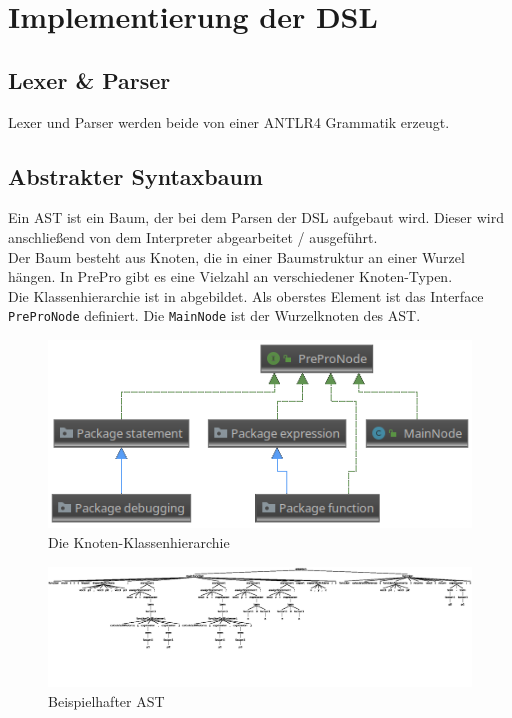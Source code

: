 
\chapter{Implementierung der DSL}

\section{Lexer \& Parser}
Lexer und Parser werden beide von einer ANTLR4 Grammatik erzeugt.

\section{Abstrakter Syntaxbaum}
Ein \ac{AST} ist ein Baum, der bei dem Parsen der \ac{DSL} aufgebaut wird.
Dieser wird anschließend von dem Interpreter abgearbeitet / ausgeführt.\\
Der Baum besteht aus Knoten, die in einer Baumstruktur an einer Wurzel hängen.
In PrePro gibt es eine Vielzahl an verschiedener Knoten-Typen.\\
Die Klassenhierarchie ist in  abgebildet.
Als oberstes Element ist das Interface \texttt{PreProNode} definiert.
Die \texttt{MainNode} ist der Wurzelknoten des \ac{AST}.

\begin{figure}
	\centering
	\includegraphics[width=\textwidth]{figures/uml_nodes}
	\caption{Die Knoten-Klassenhierarchie}
	\label{fig:NodesHierachy}
\end{figure}

\begin{figure}
	\centering
	\includegraphics[width=\textwidth]{figures/parseTree}
	\caption{Beispielhafter \ac{AST}}
	\label{fig:AST}
\end{figure}

